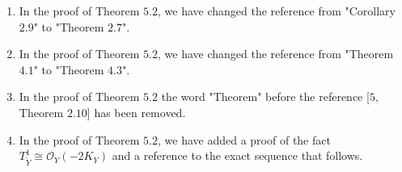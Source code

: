 \documentclass[11pt,twoside]{amsart}
\theoremstyle{plain}
\numberwithin{equation}{section}
\theoremstyle{definition}
\begin{document}
\begin{enumerate}
\item[$(43)$] In the proof of Theorem $5.2$, we have changed the reference from "Corollary $2.9$" to "Theorem $2.7$".

\item[$(44)$] In the proof of Theorem $5.2$, we have changed the reference from "Theorem $4.1$" to "Theorem $4.3$".

\item[$(45)$] In the proof of Theorem $5.2$ the word "Theorem" before the reference [$5$, Theorem $2.10$] has been removed.

\item[$(46)$] In the proof of Theorem $5.2$, we have added a proof of the fact $T_{\widetilde{Y}}^1 \cong \mathcal{O}_Y(-2K_Y)$ and a reference to the exact sequence that follows.

    
\end{enumerate}
\end{document}

